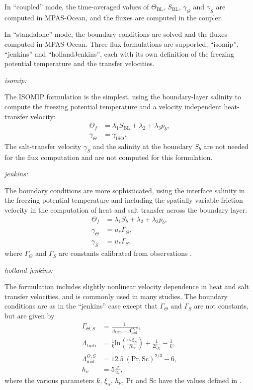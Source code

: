 In ``coupled'' mode, the time-averaged values of $\Theta_\textrm{BL}$, $S_\textrm{BL}$,
$\gamma_\Theta$ and $\gamma_S$ are computed in MPAS-Ocean, and the fluxes are computed
in the coupler.

In ``standalone'' mode, the boundary conditions are solved and the fluxes computed in
MPAS-Ocean.  Three flux formulations are supported, ``isomip'', ``jenkins'' and
``hollandJenkins'', each with its own definition of the freezing potential temperature
and the transfer velocities.

\hfill \break \noindent \textit{isomip:}

\noindent The ISOMIP formulation \citep{Hunter2006} is the simplest, using the
boundary-layer salinity to compute the freezing potential temperature and a
velocity independent heat-transfer velocity:
\begin{align}
  \Theta_f & = \lambda_1 S_\textrm{BL} + \lambda_2 + \lambda_3 p_b, \\
  \gamma_\Theta & = \gamma_\textrm{ISO}.
\end{align}
The salt-transfer velocity $\gamma_S$ and the salinity at the boundary $S_b$
are not needed for the flux computation and are not computed for this
formulation.

\hfill \break \noindent \textit{jenkins:}

\noindent The \citet{Jenkins2010} boundary conditions are more sophisticated,
using the interface salinity in the freezing potential temperature
and including the spatially variable friction velocity in the computation of
heat and salt transfer across the boundary layer:
\begin{align}
  \Theta_f & = \lambda_1 S_b + \lambda_2 + \lambda_3 p_b, \\
  \gamma_\Theta & = u_* \Gamma_\Theta, \\
  \gamma_S & = u_* \Gamma_S,
\end{align}
where $\Gamma_\Theta$ and $\Gamma_S$ are constants calibrated from observations
\citep[e.g.][]{Jenkins2010}.

\hfill \break \noindent \textit{holland-jenkins:}

\noindent The \citet{Holland1999} formulation includes slightly nonlinear velocity
dependence in heat and salt transfer velocities, and is commonly used in many studies.
The boundary conditions are as in the ``jenkins'' case except that $\Gamma_\Theta$ and
$\Gamma_S$ are not constants, but are given by
\begin{align}
  \Gamma_{\Theta,S} & = \frac{1}{\Lambda_\textrm{turb} + \Lambda_\textrm{mol}^{\Theta,S}}, \\
  \Lambda_\textrm{turb} & = \frac{1}{k} \textrm{ln}\left(\frac{u_* \xi_N}{f h_\nu}\right) + \frac{1}{2 \xi_N} - \frac{1}{k}, \\
  \Lambda_\textrm{mol}^{\Theta,S} & = 12.5~(\textrm{Pr},\textrm{Sc})^{2/3} - 6, \\
  h_\nu & = 5 \frac{\nu}{u_*},
\end{align}
where the various parameters $k$, $\xi_n$, $h_\nu$, $\textrm{Pr}$ and $\textrm{Sc}$ have the values defined
in \citet{Holland1999}.

